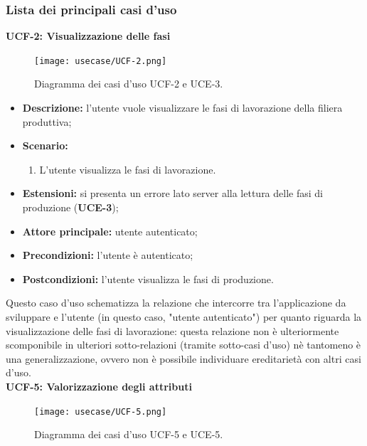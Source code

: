 \subsubsection*{Lista dei principali casi d'uso}
    \textbf{UCF-2: Visualizzazione delle fasi}
        \begin{figure}[H]
            \centering
            \texttt{[image: usecase/UCF-2.png]}
            \caption{Diagramma dei casi d'uso UCF-2 e UCE-3.}
        \end{figure}
        \begin{itemize}
            \item \textbf{Descrizione:} l’utente vuole visualizzare le fasi di lavorazione della filiera produttiva;
            \item \textbf{Scenario:}
                \begin{enumerate}
                    \item L’utente visualizza le fasi di lavorazione.
                \end{enumerate}
            \item \textbf{Estensioni:} si presenta un errore lato server alla lettura delle fasi di produzione (\textbf{UCE-3});
            \item \textbf{Attore principale:} utente autenticato;
            \item \textbf{Precondizioni:} l’utente è autenticato;
            \item \textbf{Postcondizioni:} l’utente visualizza le fasi di produzione.
        \end{itemize}
      Questo caso d'uso schematizza la relazione che intercorre tra l'applicazione da sviluppare e l'utente (in questo caso, "utente autenticato") per quanto riguarda la visualizzazione delle fasi di lavorazione: questa relazione non è ulteriormente scomponibile in ulteriori sotto-relazioni (tramite sotto-casi d'uso) 
      nè tantomeno è una generalizzazione, ovvero non è possibile individuare ereditarietà con altri casi d'uso.\\
        \textbf{UCF-5: Valorizzazione degli attributi}
        \begin{figure}[H]
            \centering
            \texttt{[image: usecase/UCF-5.png]}
            \caption{Diagramma dei casi d'uso UCF-5 e UCE-5.}
        \end{figure}
